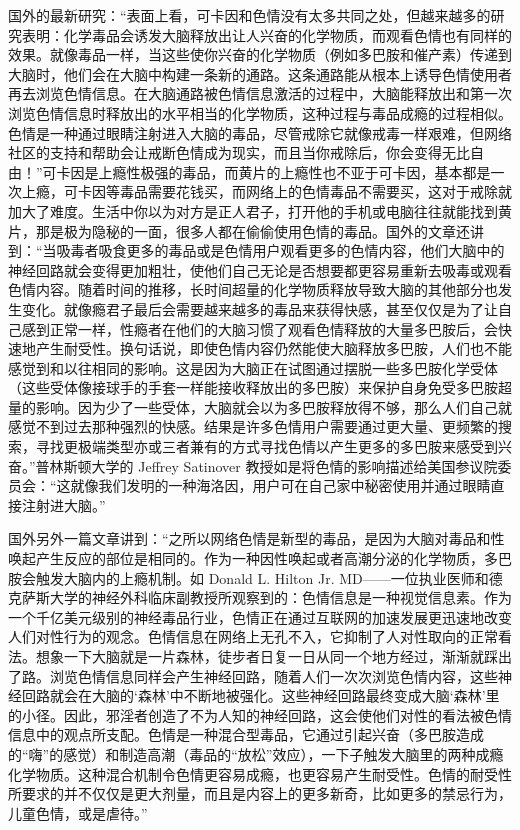 国外的最新研究：“表面上看，可卡因和色情没有太多共同之处，但越来越多的研究表明：化学毒品会诱发大脑释放出让人兴奋的化学物质，而观看色情也有同样的效果。就像毒品一样，当这些使你兴奋的化学物质（例如多巴胺和催产素）传递到大脑时，他们会在大脑中构建一条新的通路。这条通路能从根本上诱导色情使用者再去浏览色情信息。在大脑通路被色情信息激活的过程中，大脑能释放出和第一次浏览色情信息时释放出的水平相当的化学物质，这种过程与毒品成瘾的过程相似。色情是一种通过眼睛注射进入大脑的毒品，尽管戒除它就像戒毒一样艰难，但网络社区的支持和帮助会让戒断色情成为现实，而且当你戒除后，你会变得无比自由！”可卡因是上瘾性极强的毒品，而黄片的上瘾性也不亚于可卡因，基本都是一次上瘾，可卡因等毒品需要花钱买，而网络上的色情毒品不需要买，这对于戒除就加大了难度。生活中你以为对方是正人君子，打开他的手机或电脑往往就能找到黄片，那是极为隐秘的一面，很多人都在偷偷使用色情的毒品。国外的文章还讲到：“当吸毒者吸食更多的毒品或是色情用户观看更多的色情内容，他们大脑中的神经回路就会变得更加粗壮，使他们自己无论是否想要都更容易重新去吸毒或观看色情内容。随着时间的推移，长时间超量的化学物质释放导致大脑的其他部分也发生变化。就像瘾君子最后会需要越来越多的毒品来获得快感，甚至仅仅是为了让自己感到正常一样，性瘾者在他们的大脑习惯了观看色情释放的大量多巴胺后，会快速地产生耐受性。换句话说，即使色情内容仍然能使大脑释放多巴胺，人们也不能感觉到和以往相同的影响。这是因为大脑正在试图通过摆脱一些多巴胺化学受体（这些受体像接球手的手套一样能接收释放出的多巴胺）来保护自身免受多巴胺超量的影响。因为少了一些受体，大脑就会以为多巴胺释放得不够，那么人们自己就感觉不到过去那种强烈的快感。结果是许多色情用户需要通过更大量、更频繁的搜索，寻找更极端类型亦或三者兼有的方式寻找色情以产生更多的多巴胺来感受到兴奋。”普林斯顿大学的 Jeffrey Satinover 教授如是将色情的影响描述给美国参议院委员会：“这就像我们发明的一种海洛因，用户可在自己家中秘密使用并通过眼睛直接注射进大脑。”

国外另外一篇文章讲到：“之所以网络色情是新型的毒品，是因为大脑对毒品和性唤起产生反应的部位是相同的。作为一种因性唤起或者高潮分泌的化学物质，多巴胺会触发大脑内的上瘾机制。如 Donald L. Hilton Jr. MD——一位执业医师和德克萨斯大学的神经外科临床副教授所观察到的：色情信息是一种视觉信息素。作为一个千亿美元级别的神经毒品行业，色情正在通过互联网的加速发展更迅速地改变人们对性行为的观念。色情信息在网络上无孔不入，它抑制了人对性取向的正常看法。想象一下大脑就是一片森林，徒步者日复一日从同一个地方经过，渐渐就踩出了路。浏览色情信息同样会产生神经回路，随着人们一次次浏览色情内容，这些神经回路就会在大脑的‘森林’中不断地被强化。这些神经回路最终变成大脑‘森林’里的小径。因此，邪淫者创造了不为人知的神经回路，这会使他们对性的看法被色情信息中的观点所支配。色情是一种混合型毒品，它通过引起兴奋（多巴胺造成的“嗨”的感觉）和制造高潮（毒品的“放松”效应），一下子触发大脑里的两种成瘾化学物质。这种混合机制令色情更容易成瘾，也更容易产生耐受性。色情的耐受性所要求的并不仅仅是更大剂量，而且是内容上的更多新奇，比如更多的禁忌行为，儿童色情，或是虐待。”

